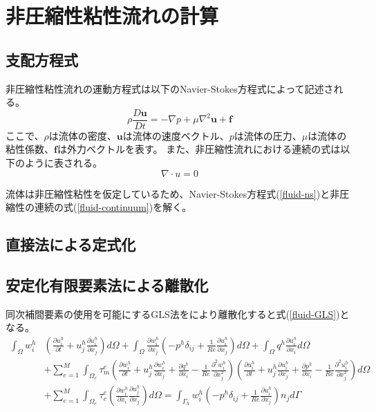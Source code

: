\newpage
\section{非圧縮性粘性流れの計算}
\subsection{支配方程式}
非圧縮性粘性流れの運動方程式は以下のNavier-Stokes方程式によって記述される。
\begin{equation}
\label{fluid-ns}
\rho \frac{D\bm{u}}{Dt} = - \nabla p + \mu \nabla^{2} \bm{u} + \bm{f}
\end{equation}
ここで、$\rho$は流体の密度、$\bm{u}$は流体の速度ベクトル、$p$は流体の圧力、$\mu$は流体の粘性係数、$\bm{f}$は外力ベクトルを表す。
また、非圧縮性流れにおける連続の式は以下のように表される。
\begin{equation}
\label{fluid-continuum}
\nabla \cdot u = 0
\end{equation}

流体は非圧縮性粘性を仮定しているため、Navier-Stokes方程式(\ref{fluid-ns})と非圧縮性の連続の式(\ref{fluid-continuum})を解く。

\subsection{直接法による定式化}

\subsection{安定化有限要素法による離散化}
同次補間要素の使用を可能にするGLS法をにより離散化すると式(\ref{fluid-GLS})となる。
\begin{equation}
\label{fluid-GLS}
	\begin{aligned} 
		\int_{\Omega} w_i^h & \left(\frac{\partial u_i^h}{\partial t}+u_j^h \frac{\partial u_i^h}{\partial x_j}\right) d \Omega+\int_{\Omega} \frac{\partial w_i^h}{\partial x_j}\left(-p^h \delta_{i j}+\frac{1}{R e} \frac{\partial u_i^h}{\partial x_j}\right) d \Omega+\int_{\Omega} q^h \frac{\partial u_i^h}{\partial x_i} d \Omega \\ & 
		+\sum_{e=1}^M \int_{\Omega_e} \tau_m^e\left(\frac{\partial w_i^h}{\partial t}+u_j^h \frac{\partial w_i^h}{\partial x_j}+\frac{\partial q^h}{\partial x_i}-\frac{1}{R e} \frac{\partial^2 w_i^h}{\partial x_j^2}\right)\left(\frac{\partial u_i^h}{\partial t}+u_j^h \frac{\partial u_i^h}{\partial x_j}+\frac{\partial p^h}{\partial x_i}-\frac{1}{R e} \frac{\partial^2 u_i^h}{\partial x_j^2}\right) d \Omega \\ & 
		+\sum_{e=1}^M \int_{\Omega_e} \tau_c^e\left(\frac{\partial w_i^h}{\partial x_i} \frac{\partial u_j^h}{\partial x_j}\right) d \Omega=\int_{\Gamma_h} w_i^h\left(-p^h \delta_{i j}+\frac{1}{R e} \frac{\partial u_i^h}{\partial x_j}\right) n_j d \Gamma
	\end{aligned}
\end{equation}


